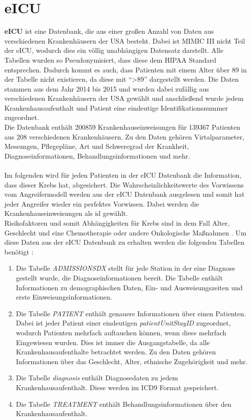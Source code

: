 \documentclass[german,version-2020-11]{uzl-thesis}
\begin{document}
\section{eICU}
\textbf{eICU} ist eine Datenbank, die aus einer großen Anzahl von Daten aus verschiedenen Krankenhäusern der USA besteht. Dabei ist MIMIC III nicht Teil der eICU, wodurch dies ein völlig unabhängigen Datensatz darstellt. Alle Tabellen wurden so Pseudonymisiert, dass diese dem HIPAA Standard entsprechen. Dadurch kommt es auch, dass Patienten mit einem Alter über 89 in der Tabelle nicht existieren, da diese mit \enquote{>89} dargestellt werden. Die Daten stammen aus dem Jahr 2014 bis 2015 und wurden dabei zufällig aus verschiedenen Krankenhäusern der USA gewählt und anschließend wurde jedem Krankenhausaufenthalt und Patient eine eindeutige Identifikationsnummer zugeordnet. \\ 
Die Datenbank enthält 200859 Krankenhauseinweisungen für 139367 Patienten aus 208 verschiedenen Krankenhäusern. Zu den Daten gehören Virtalparameter, Messungen, Pflegepläne, Art und Schweregrad der Krankheit, Diagnoseinformationen, Behandlungsinformationen und mehr. \\ \\
Im folgenden wird für jeden Patienten in der eICU Datenbank die Information, dass dieser Krebs hat, abgesichert. Die Wahrscheinlichkeitswerte des Vorwissens vom Angreifermodell werden aus der eICU Datenbank ausgelesen und somit hat jeder Angreifer wieder ein  perfektes Vorwissen.  Dabei werden die Krankenhauseinweisungen als id gewählt. \\ 
Risikofaktoren und somit Abhängigkeiten für Krebs sind in dem Fall Alter, Geschlecht und eine Chemotherapie oder andere Onkologische Maßnahmen .\cite{13,14} Um diese Daten aus der eICU Datenbank zu erhalten werden die folgenden Tabellen benötigt : 
\begin{enumerate}
	\item Die Tabelle \textit{ADMISSIONSDX} stellt für jede Station in der eine Diagnose gestellt wurde, die Diagnoseinformationen bereit. Die Tabelle enthält Informationen zu demographischen Daten, Ein- und Ausweisungszeiten und erste Einweisungsinformationen.
	\item Die Tabelle \textit{PATIENT} enthält genauere Informationen über einen Patienten.  Dabei ist jeder Patient einer eindeutigen \textit{patientUnitStayID} zugeordnet, wodurch Patienten mehrfach auftauchen können, wenn diese mehrfach Eingewiesen wurden. Dies ist immer die Ausgangstabelle, da alle Krankenhausaufenthalte betrachtet werden. Zu den Daten gehören Informationen über das Geschlecht, Alter, ethnische Zugehörigkeit und mehr.
	\item Die Tabelle \textit{diagnosis} enthält Diagnosedaten zu jedem Krankenhausaufenthalt. Diese werden im ICD9 Format gespeichert.
	\item Die Tabelle \textit{TREATMENT } enthält Behandlungsinformationen über den Krankenhausaufenthalt.
\end{enumerate} 
\end{document}
